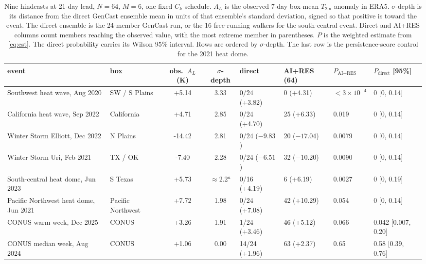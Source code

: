 \documentclass[10pt,twocolumn]{article}
\newcommand{\AL}{A_L}
\newcommand{\Tm}{T_{2\mathrm{m}}}
\newcommand{\ck}{C_k}
\begin{document}
\begin{table}[tp]
\centering\footnotesize\setlength{\tabcolsep}{4.5pt}
\caption{Nine hindcasts at 21-day lead, $N = 64$, $M = 6$, one fixed $\ck$ schedule. $\AL$ is the observed 7-day box-mean $\Tm$ anomaly in ERA5. $\sigma$-depth is its distance from the direct GenCast ensemble mean in units of that ensemble's standard deviation, signed so that positive is toward the event. The direct ensemble is the 24-member GenCast run, or the 16 free-running walkers for the south-central event. Direct and AI+RES columns count members reaching the observed value, with the most extreme member in parentheses. $P$ is the weighted estimate from \cref{eq:est}. The direct probability carries its Wilson 95\% interval. Rows are ordered by $\sigma$-depth. The last row is the persistence-score control for the 2021 heat dome.}
\label{tab:slate}
\begin{tabular}{@{}llS[table-format=+2.2]S[table-format=+1.2]llll@{}}
\toprule
event & box & {obs.\ $\AL$ (K)} & {$\sigma$-depth} & direct & AI+RES (64) & $P_{\text{AI+RES}}$ & $P_{\text{direct}}$ [95\%] \\
\midrule
Southwest heat wave, Aug 2020        & SW / S Plains     & +5.14  & 3.33 & 0/24 (+3.82)   & 0 (+4.31)    & $<3\times10^{-4}$ & 0 [0, 0.14] \\
California heat wave, Sep 2022       & California        & +4.71  & 2.85 & 0/24 (+4.70)   & 25 (+6.33)   & 0.019             & 0 [0, 0.14] \\
Winter Storm Elliott, Dec 2022       & N Plains          & -14.42 & 2.81 & 0/24 ($-9.83$) & 20 ($-17.04$) & 0.0079           & 0 [0, 0.14] \\
Winter Storm Uri, Feb 2021           & TX / OK           & -7.40  & 2.28 & 0/24 ($-6.51$) & 32 ($-10.20$) & 0.0090           & 0 [0, 0.14] \\
South-central heat dome, Jun 2023    & S Texas           & +5.73  & {$\approx$2.2$^a$} & 0/16 (+4.19)   & 6 (+6.19)    & 0.0027            & 0 [0, 0.19] \\
Pacific Northwest heat dome, Jun 2021 & Pacific Northwest & +7.72  & 1.98 & 0/24 (+7.08)   & 42 (+10.29)  & 0.054             & 0 [0, 0.14] \\
CONUS warm week, Dec 2025            & CONUS             & +3.26  & 1.91 & 1/24 (+3.46)   & 46 (+5.12)   & 0.066             & 0.042 [0.007, 0.20] \\
CONUS median week, Aug 2024          & CONUS             & +1.06  & 0.00 & 14/24 (+1.96)  & 63 (+2.37)   & 0.65              & 0.58 [0.39, 0.76] \\

\end{tabular}
\end{table}
\end{document}
